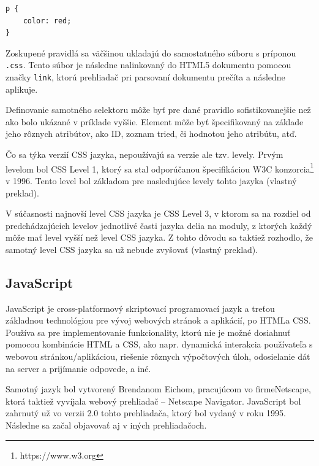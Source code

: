 \begin{minipage}[]{\linewidth}
\begin{verbatim}
p {
    color: red;
}
\end{verbatim}
\end{minipage}

Zoskupené pravidlá sa väčšinou ukladajú do samostatného súboru s príponou \texttt{.css}. Tento súbor je následne nalinkovaný do HTML5 dokumentu pomocou značky \texttt{link}, ktorú prehliadač pri parsovaní dokumentu prečíta a následne aplikuje.

Definovanie samotného selektoru môže byť pre dané pravidlo sofistikovanejšie než ako bolo ukázané v príklade vyššie. Element môže byť špecifikovaný na základe jeho rôznych atribútov, ako ID, zoznam tried, či hodnotou jeho atribútu, atď.

Čo sa týka verzií CSS jazyka, nepoužívajú sa verzie ale tzv. levely. Prvým levelom bol CSS Level 1, ktorý sa stal odporúčanou špecifikáciou W3C konzorcia\footnote{https://www.w3.org} v 1996. Tento level bol základom pre nasledujúce levely tohto jazyka \cite{about_css} (vlastný preklad).

V súčasnosti najnovší level CSS jazyka je CSS Level 3, v ktorom sa na rozdiel od predchádzajúcich levelov jednotlivé časti jazyka delia na moduly, z ktorých každý môže mať level vyšší než level CSS jazyka. Z tohto dôvodu sa taktiež rozhodlo, že samotný level CSS jazyka sa už nebude zvyšovať \cite{about_css} (vlastný preklad).

\subsection {JavaScript}
JavaScript je cross-platformový skriptovací programovací jazyk a treťou základnou technológiou pre vývoj webových stránok a aplikácií, po HTML\newline a CSS. Používa sa pre implementovanie funkcionality, ktorú nie je možné dosiahnuť pomocou kombinácie HTML a CSS, ako napr. dynamická interakcia používateľa s webovou stránkou/aplikáciou, riešenie rôznych výpočtových úloh, odosielanie dát na server a prijímanie odpovede, a iné.

Samotný jazyk bol vytvorený Brendanom Eichom, pracujúcom vo firme\newline Netscape, ktorá taktiež vyvíjala webový prehliadač -- Netscape Navigator. \newline JavaScript bol zahrnutý už vo verzii 2.0 tohto prehliadača, ktorý bol vydaný v roku 1995. Následne sa začal objavovať aj v iných prehliadačoch. 

